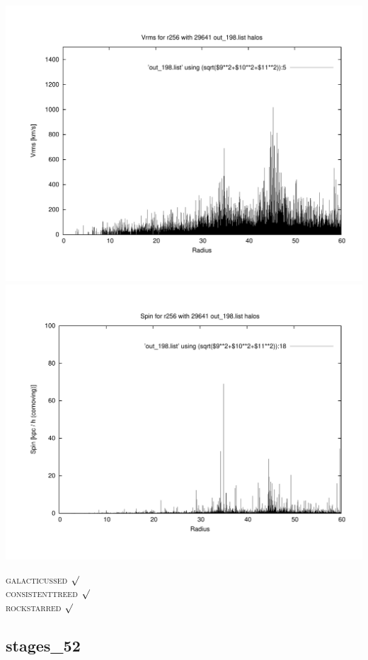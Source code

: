 \includegraphics[scale=0.3]{stages_51/plot_Vrms_out_198.pdf}
\includegraphics[scale=0.3]{stages_51/plot_spin_out_198.pdf}

\textsc{galacticussed} $\surd$ \\
\textsc{consistenttreed} $\surd$ \\ 
\textsc{rockstarred} $\surd$


% 
%
%
%
%
%
%
%


\newpage
\subsection{stages\_52}




